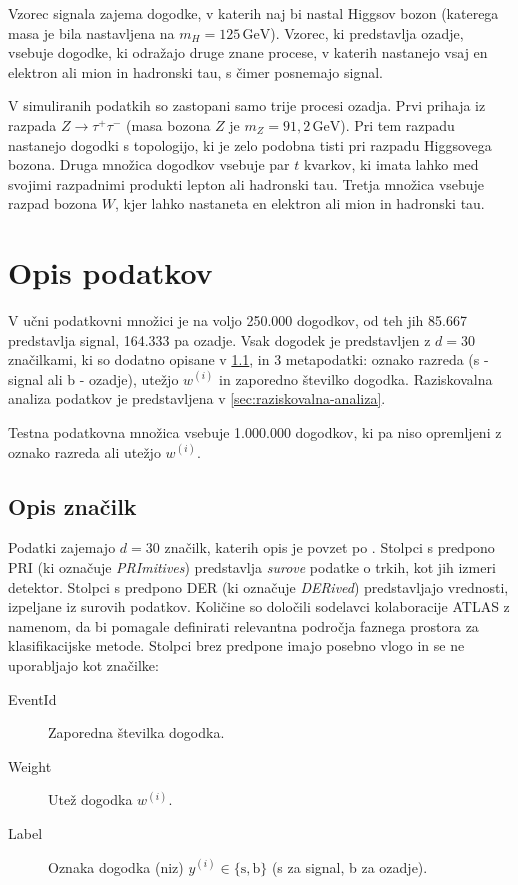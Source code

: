 \documentclass[11pt,a4paper,openany]{book}
\begin{document}
Vzorec signala zajema dogodke, v katerih naj bi nastal Higgsov bozon (katerega masa je bila nastavljena na $m_H = 125\,\text{GeV}$). Vzorec, ki predstavlja ozadje, vsebuje dogodke, ki odražajo druge znane procese, v katerih nastanejo vsaj en elektron ali mion in hadronski tau, s čimer posnemajo signal.

V simuliranih podatkih so zastopani samo trije procesi ozadja. Prvi prihaja iz razpada $Z \rightarrow \tau^+\tau^-$ (masa bozona $Z$ je $m_Z = 91,2\,\text{GeV}$). Pri tem razpadu nastanejo dogodki s topologijo, ki je zelo podobna tisti pri razpadu Higgsovega bozona. Druga množica dogodkov vsebuje par $t$ kvarkov, ki imata lahko med svojimi razpadnimi produkti lepton ali hadronski tau. Tretja množica vsebuje razpad bozona $W$, kjer lahko nastaneta en elektron ali mion in hadronski tau. 

\section{Opis podatkov}
\label{ch:opis_podatkov}

V učni podatkovni množici je na voljo 250.000 dogodkov, od teh jih 85.667 predstavlja signal, 164.333 pa ozadje. Vsak dogodek je predstavljen z $d = 30$ značilkami, ki so dodatno opisane v \ref{sec:opis-znacilk}, in 3 metapodatki: oznako razreda (s - signal ali b - ozadje), utežjo $w^{(i)}$ in zaporedno številko dogodka. Raziskovalna analiza podatkov je predstavljena v \ref{sec:raziskovalna-analiza}.

Testna podatkovna množica vsebuje 1.000.000 dogodkov, ki pa niso opremljeni z oznako razreda ali utežjo $w^{(i)}$. 

\subsection{Opis značilk}
\label{sec:opis-znacilk}
Podatki zajemajo $d = 30$ značilk, katerih opis je povzet po \cite{Adam-Bourdarios14}. Stolpci s predpono PRI (ki označuje \textit{PRImitives}) predstavlja \textit{surove} podatke o trkih, kot jih izmeri detektor. Stolpci s predpono DER (ki označuje \textit{DERived}) predstavljajo vrednosti, izpeljane iz surovih podatkov. Količine so določili sodelavci kolaboracije ATLAS z namenom, da bi pomagale definirati relevantna področja faznega prostora za klasifikacijske metode. Stolpci brez predpone imajo posebno vlogo in se ne uporabljajo kot značilke:

\begin{changemargin}{0.5cm}{0.0cm} 
\begin{description}
	\item [EventId] 	Zaporedna številka dogodka.
	\item [Weight]  	Utež dogodka $w^{(i)}$.
	\item [Label] 		Oznaka dogodka (niz) $y^{(i)} \in \{\text{s}, \text{b}\}$ (s za signal, b za ozadje).	
\end{description}
\end{changemargin}
\end{document}
